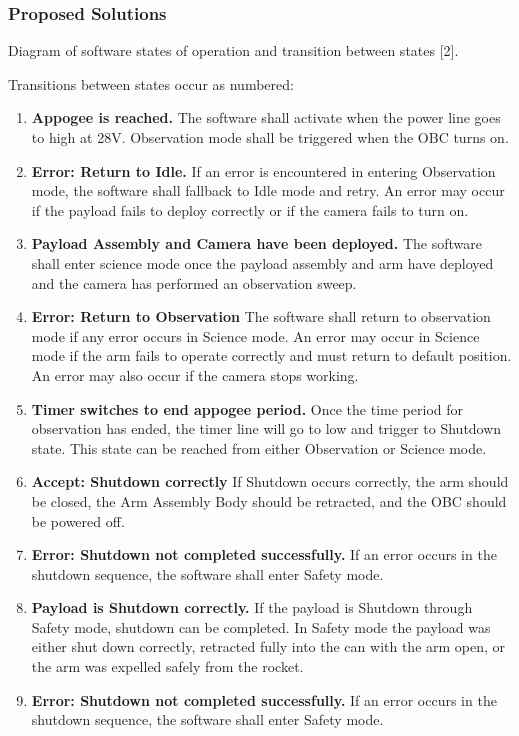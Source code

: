 \documentclass[letterpaper,10pt]{article}
\begin{document}
\subsubsection{Proposed Solutions}

\begin{center}
Diagram of software states of operation and transition between states [2].

Transitions between states occur as numbered:

\begin{enumerate}
\item{\textbf{Appogee is reached.} The software shall activate when the power line goes to high at 28V. Observation mode shall be triggered when the OBC turns on.}
\item{\textbf{Error: Return to Idle.} If an error is encountered in entering Observation mode, the software shall fallback to Idle mode and retry. An error may occur if the payload fails to deploy correctly or if the camera fails to turn on.}
\item{\textbf{Payload Assembly and Camera have been deployed.} The software shall enter science mode once the payload assembly and arm have deployed and the camera has performed an observation sweep.}
\item{\textbf{Error: Return to Observation} The software shall return to observation mode if any error occurs in Science mode. An error may occur in Science mode if the arm fails to operate correctly and must return to default position. An error may also occur if the camera stops working.}
\item{\textbf{Timer switches to end appogee period.} Once the time period for observation has ended, the timer line will go to low and trigger to Shutdown state. This state can be reached from either Observation or Science mode.}
\item{\textbf{Accept: Shutdown correctly} If Shutdown occurs correctly, the arm should be closed, the Arm Assembly Body should be retracted, and the OBC should be powered off.}
\item{\textbf{Error: Shutdown not completed successfully.} If an error occurs in the shutdown sequence, the software shall enter Safety mode.}
\item{\textbf{Payload is Shutdown correctly.} If the payload is Shutdown through Safety mode, shutdown can be completed. In Safety mode the payload was either shut down correctly, retracted fully into the can with the arm open, or the arm was expelled safely from the rocket.}
\item{\textbf{Error: Shutdown not completed successfully.} If an error occurs in the shutdown sequence, the software shall enter Safety mode.}

\end{enumerate}
\end{center}
\end{document}
